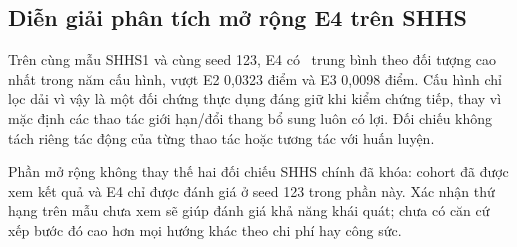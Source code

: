 \subsection{Diễn giải phân tích mở rộng E4 trên SHHS}

Trên cùng mẫu SHHS1 và cùng seed 123, E4 có \mf\ trung bình theo đối tượng cao nhất trong năm cấu hình, vượt E2 0,0323 điểm và E3 0,0098 điểm. Cấu hình chỉ lọc dải vì vậy là một đối chứng thực dụng đáng giữ khi kiểm chứng tiếp, thay vì mặc định các thao tác giới hạn/đổi thang bổ sung luôn có lợi. Đối chiếu không tách riêng tác động của từng thao tác hoặc tương tác với huấn luyện.

Phần mở rộng không thay thế hai đối chiếu SHHS chính đã khóa: cohort đã được xem kết quả và E4 chỉ được đánh giá ở seed 123 trong phần này. Xác nhận thứ hạng trên mẫu chưa xem sẽ giúp đánh giá khả năng khái quát; chưa có căn cứ xếp bước đó cao hơn mọi hướng khác theo chi phí hay công sức.

